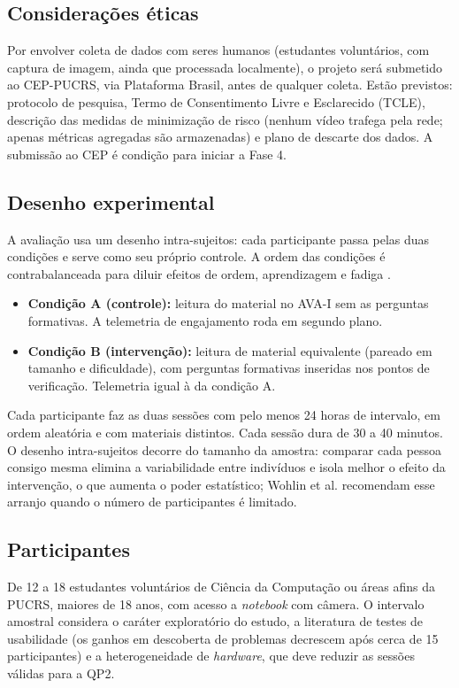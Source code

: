\documentclass[12pt,a4paper]{article}
\begin{document}
\subsection{Considerações éticas}
Por envolver coleta de dados com seres humanos (estudantes voluntários, com captura de imagem, ainda que processada localmente), o projeto será submetido ao CEP-PUCRS, via Plataforma Brasil, antes de qualquer coleta. Estão previstos: protocolo de pesquisa, Termo de Consentimento Livre e Esclarecido (TCLE), descrição das medidas de minimização de risco (nenhum vídeo trafega pela rede; apenas métricas agregadas são armazenadas) e plano de descarte dos dados. A submissão ao CEP é condição para iniciar a Fase 4.

\subsection{Desenho experimental}
A avaliação usa um desenho intra-sujeitos: cada participante passa pelas duas condições e serve como seu próprio controle. A ordem das condições é contrabalanceada para diluir efeitos de ordem, aprendizagem e fadiga \cite{WRH12}.

\begin{itemize}[leftmargin=*]
  \item \textbf{Condição A (controle):} leitura do material no AVA-I sem as perguntas formativas. A telemetria de engajamento roda em segundo plano.
  \item \textbf{Condição B (intervenção):} leitura de material equivalente (pareado em tamanho e dificuldade), com perguntas formativas inseridas nos pontos de verificação. Telemetria igual à da condição A.
\end{itemize}

Cada participante faz as duas sessões com pelo menos 24 horas de intervalo, em ordem aleatória e com materiais distintos. Cada sessão dura de 30 a 40 minutos. O desenho intra-sujeitos decorre do tamanho da amostra: comparar cada pessoa consigo mesma elimina a variabilidade entre indivíduos e isola melhor o efeito da intervenção, o que aumenta o poder estatístico; Wohlin et al. \cite{WRH12} recomendam esse arranjo quando o número de participantes é limitado.

\subsection{Participantes}
De 12 a 18 estudantes voluntários de Ciência da Computação ou áreas afins da PUCRS, maiores de 18 anos, com acesso a \emph{notebook} com câmera. O intervalo amostral considera o caráter exploratório do estudo, a literatura de testes de usabilidade \cite{Nie00} (os ganhos em descoberta de problemas decrescem após cerca de 15 participantes) e a heterogeneidade de \emph{hardware}, que deve reduzir as sessões válidas para a QP2.
\end{document}

